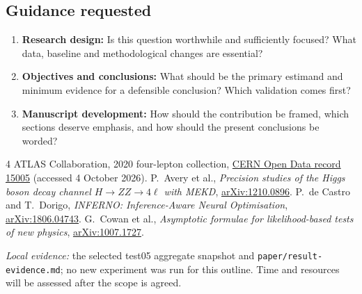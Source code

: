 \documentclass[11pt,a4paper]{article}
\newcommand{\arxivref}[1]{\href{https://arxiv.org/abs/#1}{arXiv:#1}}
\begin{document}
\subsection*{Guidance requested}
\begin{enumerate}
\setlength{\itemsep}{0.15em}\setlength{\parskip}{0pt}\setlength{\parsep}{0pt}
\item \textbf{Research design:} Is this question worthwhile and sufficiently
focused? What data, baseline and methodological changes are essential?
\item \textbf{Objectives and conclusions:} What should be the primary estimand
and minimum evidence for a defensible conclusion? Which validation comes first?
\item \textbf{Manuscript development:} How should the contribution be framed,
which sections deserve emphasis, and how should the present conclusions be worded?
\end{enumerate}

\begingroup
\small
\begin{thebibliography}{4}
\setlength{\itemsep}{0pt}
\setlength{\parskip}{0pt}
 ATLAS Collaboration, 2020 four-lepton collection,
\href{https://opendata.cern.ch/record/15005}{CERN Open Data record 15005}
(accessed 4 October 2026).
 P.~Avery et al., \textit{Precision studies of the Higgs boson
decay channel $H\to ZZ\to4\ell$ with MEKD}, \arxivref{1210.0896}.
 P.~de Castro and T.~Dorigo, \textit{INFERNO:
Inference-Aware Neural Optimisation}, \arxivref{1806.04743}.
 G.~Cowan et al., \textit{Asymptotic formulae for likelihood-based
tests of new physics}, \arxivref{1007.1727}.
\end{thebibliography}
\textit{Local evidence:} the selected test05 aggregate snapshot and
\texttt{paper/result-evidence.md}; no new experiment was run for this outline.
Time and resources will be assessed after the scope is agreed.
\endgroup
\end{document}

